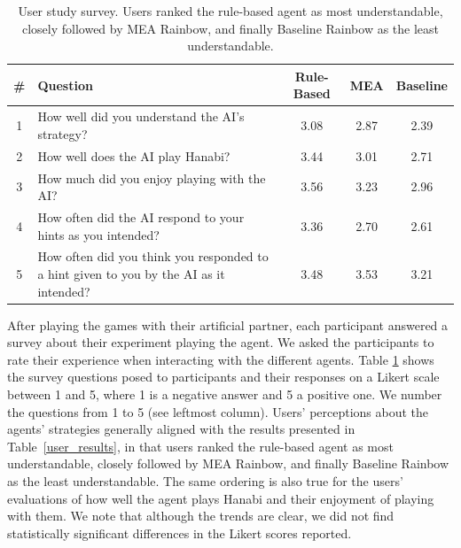 \documentclass[letterpaper]{article} %
\begin{document}
\begin{table}[t]
\centering
\footnotesize
    \begin{tabular}{c p{}ccc}
 \toprule
 \# & Question & Rule-Based & MEA & Baseline \\ [0.5ex]
 \midrule
1 & How well did you understand the AI's strategy?  & 3.08 & 2.87 & 2.39 \\
\midrule
2 & How well does the AI play Hanabi? & 3.44 & 3.01 & 2.71 \\
\midrule
3 & How much did you enjoy playing with the AI?   & 3.56 & 3.23 & 2.96 \\
 \midrule
4 & How often did the AI respond to your hints as you intended? & 3.36 & 2.70 & 2.61 \\
 \midrule
5 & How often did you think you responded to a hint given to you by the AI as it intended? & 3.48 & 3.53 & 3.21 \\ [1ex]
 \bottomrule
\end{tabular}
\caption{User study survey.
    Users ranked the rule-based agent as most understandable, closely followed by MEA Rainbow, and finally Baseline Rainbow as the least understandable.}
    \label{survey_table}
\end{table}

After playing the games with their artificial partner, each participant answered a survey about their experiment playing the agent.
We asked the participants
to rate their experience when interacting with the different agents.
Table \ref{survey_table} shows the survey questions posed to participants and their responses on a Likert scale between 1 and 5, where 1 is a negative answer and 5 a positive one. We number the questions from 1 to 5 (see leftmost column).  Users' perceptions about the agents' strategies generally aligned with the results presented in Table~\ref{user_results}, in that  users ranked the rule-based agent as most understandable, closely followed by MEA Rainbow, and finally Baseline Rainbow as the least understandable. The same ordering is also true for the users' evaluations of how well the agent plays Hanabi and their enjoyment of playing with them.
We note that although the trends are clear, we did not find statistically significant differences in the  Likert scores reported. %
\end{document}
